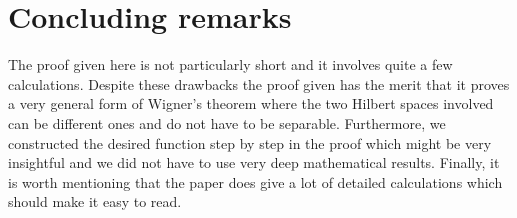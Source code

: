 \section{Concluding remarks}
The proof given here is not particularly short and it involves quite a few calculations. Despite these drawbacks the proof given has the merit that it proves a very general form of Wigner's theorem where the two Hilbert spaces involved can be different ones and do not have to be separable. Furthermore, we constructed the desired function step by step in the proof which might be very insightful and we did not have to use very deep mathematical results. Finally, it is worth mentioning that the paper does give a lot of detailed calculations which should make it easy to read.